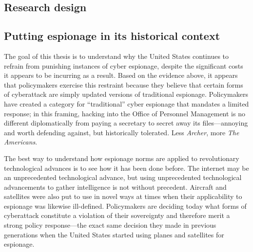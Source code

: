 \documentclass{memoir}
\begin{document}
\begin{refsegment}


\section{Research design}
\subsection{Putting espionage in its historical context}
The goal of this thesis is to understand why the United States continues to refrain from punishing instances of cyber espionage, despite the significant costs it appears to be incurring as a result. Based on the evidence above, it appears that policymakers exercise this restraint because they believe that certain forms of cyberattack are simply updated versions of traditional espionage. Policymakers have created a category for ``traditional'' cyber espionage that mandates a limited response; in this framing, hacking into the Office of Personnel Management is no different diplomatically from paying a secretary to secret away its files---annoying and worth defending against, but historically tolerated. Less \emph{Archer}, more \emph{The Americans}.

The best way to understand how espionage norms are applied to revolutionary technological advances is to see how it has been done before. The internet may be an unprecedented technological advance, but using unprecedented technological advancements to gather intelligence is not without precedent. Aircraft and satellites were also put to use in novel ways at times when their applicability to espionage was likewise ill-defined. Policymakers are deciding today what forms of cyberattack constitute a violation of their sovereignty and therefore merit a strong policy response---the exact same decision they made in previous generations when the United States started using planes and satellites for espionage.


\end{refsegment}
\end{document}
